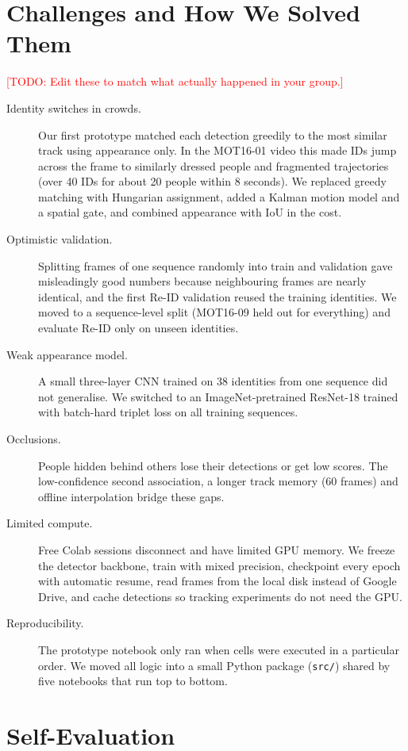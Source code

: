 \documentclass[11pt,letterpaper]{article}
\newcommand{\todo}[1]{\textcolor{red}{[TODO: #1]}}
\begin{document}
\section{Challenges and How We Solved Them}
\todo{Edit these to match what actually happened in your group.}
\begin{description}
\item[Identity switches in crowds.] Our first prototype matched each detection greedily to the most similar track using appearance only. In the MOT16-01 video this made IDs jump across the frame to similarly dressed people and fragmented trajectories (over 40 IDs for about 20 people within 8 seconds). We replaced greedy matching with Hungarian assignment, added a Kalman motion model and a spatial gate, and combined appearance with IoU in the cost.
\item[Optimistic validation.] Splitting frames of one sequence randomly into train and validation gave misleadingly good numbers because neighbouring frames are nearly identical, and the first Re-ID validation reused the training identities. We moved to a sequence-level split (MOT16-09 held out for everything) and evaluate Re-ID only on unseen identities.
\item[Weak appearance model.] A small three-layer CNN trained on 38 identities from one sequence did not generalise. We switched to an ImageNet-pretrained ResNet-18 trained with batch-hard triplet loss on all training sequences.
\item[Occlusions.] People hidden behind others lose their detections or get low scores. The low-confidence second association, a longer track memory (60 frames) and offline interpolation bridge these gaps.
\item[Limited compute.] Free Colab sessions disconnect and have limited GPU memory. We freeze the detector backbone, train with mixed precision, checkpoint every epoch with automatic resume, read frames from the local disk instead of Google Drive, and cache detections so tracking experiments do not need the GPU.
\item[Reproducibility.] The prototype notebook only ran when cells were executed in a particular order. We moved all logic into a small Python package (\texttt{src/}) shared by five notebooks that run top to bottom.
\end{description}

\section{Self-Evaluation}
\end{document}
